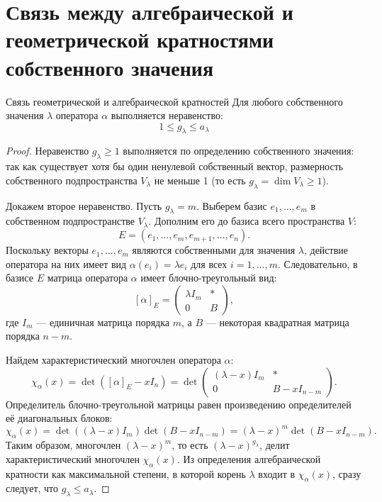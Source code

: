 
\section{Связь между алгебраической и геометрической кратностями собственного значения}

\begin{Theorem}{Связь геометрической и алгебраической кратностей}{}
	Для любого собственного значения $\lambda$ оператора $\alpha$ выполняется неравенство:
	\[
	1\le g_\lambda\le a_\lambda
	\]
	
\end{Theorem}

\begin{proof}
	Неравенство $g_\lambda\ge 1$ выполняется по определению собственного значения: так как существует хотя бы один ненулевой собственный вектор, размерность собственного подпространства $V_\lambda$ не меньше 1 (то есть $g_\lambda = \dim V_\lambda \ge 1$).
	
	Докажем второе неравенство. Пусть $g_\lambda = m$. Выберем базис $e_1, \dots, e_m$ в собственном подпространстве $V_\lambda$.
	Дополним его до базиса всего пространства $V$:
	\[
	E = (e_1, \dots, e_m, e_{m+1}, \dots, e_n).
	\]
	Поскольку векторы $e_1, \dots, e_m$ являются собственными для значения $\lambda$, действие оператора на них имеет вид $\alpha(e_i) = \lambda e_i$ для всех $i = 1, \dots, m$. 
	Следовательно, в базисе $E$ матрица оператора $\alpha$ имеет блочно-треугольный вид:
	\[
	[\alpha]_E = \begin{pmatrix} \lambda I_m & * \\ 0 & B \end{pmatrix},
	\]
	где $I_m$ — единичная матрица порядка $m$, а $B$ — некоторая квадратная матрица порядка $n-m$.
	
	Найдем характеристический многочлен оператора $\alpha$:
	\[
	\chi_\alpha(x) = \det([\alpha]_E - xI_n) = \det \begin{pmatrix} (\lambda - x)I_m & * \\ 0 & B - xI_{n-m} \end{pmatrix}.
	\]
	Определитель блочно-треугольной матрицы равен произведению определителей её диагональных блоков:
	\[
	\chi_\alpha(x) = \det((\lambda - x)I_m) \det(B - xI_{n-m}) = (\lambda - x)^m \det(B - xI_{n-m}).
	\]
	Таким образом, многочлен $(\lambda - x)^m$, то есть $(\lambda - x)^{g_\lambda}$, делит характеристический многочлен $\chi_\alpha(x)$. 
	Из определения алгебраической кратности как максимальной степени, в которой корень $\lambda$ входит в $\chi_\alpha(x)$, сразу следует, что $g_\lambda \le a_\lambda$.
\end{proof}